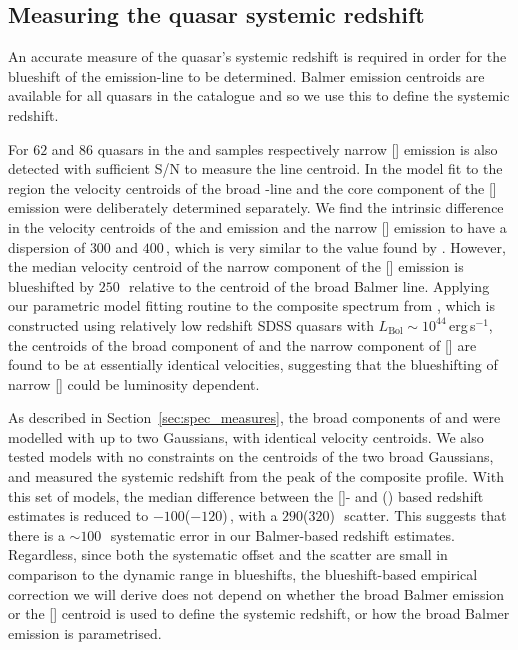 \subsection{Measuring the quasar systemic redshift}
\label{sec:zsys}

An accurate measure of the quasar's systemic redshift is required in order for the blueshift of the  emission-line to be determined.
Balmer emission centroids are available for all quasars in the catalogue and so we use this to define the systemic redshift.

For $62$ and $86$ quasars in the \ha and \hb samples respectively narrow [] emission is also detected with sufficient S/N to measure the line centroid. 
In the model fit to the \hb region the velocity centroids of the broad \hbns-line and the core component of the [] emission were deliberately determined separately.
We find the intrinsic difference in the velocity centroids of the \ha and \hb emission and the narrow [] emission to have a dispersion of $300$ and $400$\,\kms, which is very similar to the value found by \citet{shen16b}. 
However, the median velocity centroid of the narrow component of the [] emission is blueshifted by $250$\,\kms\, relative to the centroid of the broad Balmer line. 
Applying our parametric model fitting routine to the composite spectrum from \citet{hewett10}, which is constructed using relatively low redshift SDSS quasars with $L_{\text{Bol}}\sim10^{44}$\,erg\,s$^{-1}$, the centroids of the broad component of \hb and the narrow component of [] are found to be at essentially identical velocities, suggesting that the blueshifting of narrow [] could be luminosity dependent.

As described in Section~\ref{sec:spec_measures}, the broad components of \ha and \hb were modelled with up to two Gaussians, with identical velocity centroids. 
We also tested models with no constraints on the centroids of the two broad Gaussians, and measured the systemic redshift from the peak of the composite profile. 
With this set of models, the median difference between the []- and \hans(\hbns) based redshift estimates is reduced to $-100$($-120$)\,\kms, with a $290$($320$)\,\kms\, scatter. 
This suggests that there is a $\sim100$\,\kms\, systematic error in our Balmer-based redshift estimates. 
Regardless, since both the systematic offset and the scatter are small in comparison to the dynamic range in  blueshifts, the blueshift-based empirical correction we will derive does not depend on whether the broad Balmer emission or the [] centroid is used to define the systemic redshift, or how the broad Balmer emission is parametrised. 

